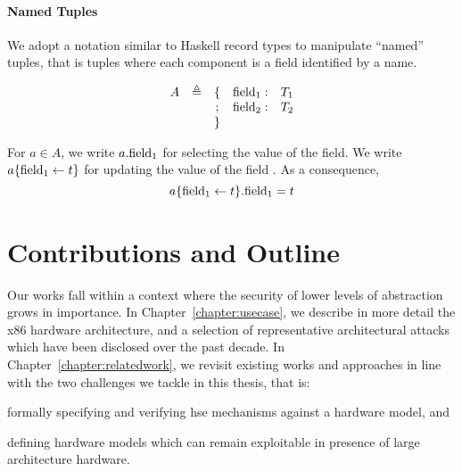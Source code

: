 \paragraph{Named Tuples}
%
We adopt a notation similar to Haskell record types to manipulate ``named''
tuples, that is tuples where each component is a field identified by a name.

\[
  \begin{array}{rccll}
    A & \triangleq & \{ & \mathrm{field_1}: & T_1 \\
      &            & ;  & \mathrm{field_2}: & T_2 \\
      &            & \} &
  \end{array}
\]

For $a \in A$, we write $a.\mathrm{field_1}$ for selecting the value of the
 field. We write $a \{ \mathrm{field_1} \leftarrow t \}$ for
updating the value of the field . As a consequence,
%
\[
  a \{ \mathrm{field_1} \leftarrow t \}.\mathrm{field_1} = t
\]

\section{Contributions and Outline}

Our works fall within a context where the security of lower levels of
abstraction  grows in importance.
%
In Chapter~\ref{chapter:usecase}, we describe in more detail the x86 hardware
architecture, and a selection of representative architectural attacks which have
been disclosed over the past decade.
%
In Chapter~\ref{chapter:relatedwork}, we revisit existing works and approaches
in line with the two challenges we tackle in this thesis, that is:
%
\begin{inparaenum}[(1)]
\item formally specifying and verifying \ac{hse} mechanisms against a hardware
  model, and
%
\item defining hardware models which can remain exploitable in presence of large
  architecture hardware. 
\end{inparaenum}



